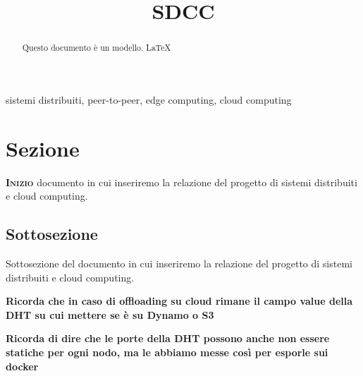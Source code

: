 \documentclass[conference]{IEEEtran}
\begin{document}
\title{SDCC}

\author{
}


\maketitle

\begin{abstract}
Questo documento è un modello. \LaTeX
\end{abstract}

\begin{IEEEkeywords}
sistemi distribuiti, peer-to-peer, edge computing, cloud computing
\end{IEEEkeywords}

\section{Sezione}

\lettrine{\textbf{I}}{\textbf{nizio}} documento in cui inseriremo la relazione del
progetto di sistemi distribuiti e cloud computing.\cite{foo}

\subsection{Sottosezione}

Sottosezione del documento in cui inseriremo la relazione del progetto di sistemi
distribuiti e cloud computing.

\textbf{Ricorda che in caso di offloading su cloud rimane il campo value della DHT su cui mettere se è su Dynamo o S3}

\textbf{Ricorda di dire che le porte della DHT possono anche non essere statiche per ogni nodo, ma le abbiamo messe così per esporle sui docker}

\printbibliography
\end{document}
